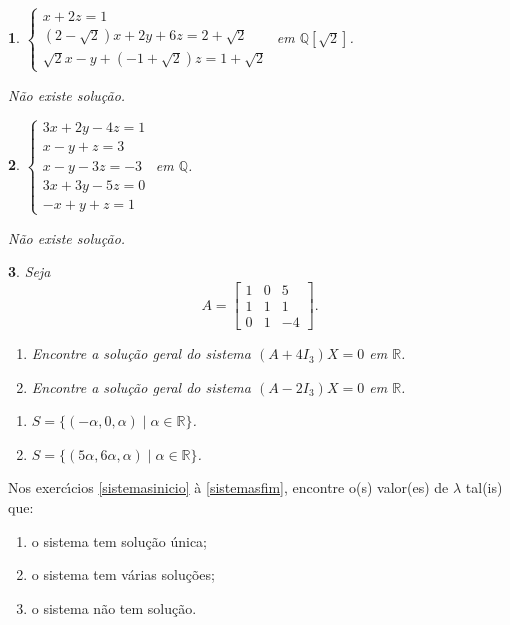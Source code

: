 \documentclass[12pt]{exam}
\newtheorem{exercicio}{}
\newcommand{\rac}{\mathbb{Q}}
\newcommand{\real}{\mathbb{R}}
\begin{document}
\begin{exercicio}
  $\begin{cases}
    x + 2z = 1\\
    (2 - \sqrt{2})x + 2y + 6z = 2 + \sqrt{2}\\
    \sqrt{2}x - y + (-1 + \sqrt{2})z = 1 + \sqrt{2}
  \end{cases}$ em $\rac[\sqrt{2}]$.
  \begin{solucao}
    N\~ao existe solu\c{c}\~ao.
  \end{solucao}
\end{exercicio}


\begin{exercicio}\label{sistemalinearfim}
  $\begin{cases}
    3x + 2y - 4z = 1\\
    x - y + z = 3\\
    x - y - 3z = -3\\
    3x + 3y - 5z =0\\
    -x + y + z = 1
  \end{cases}$ em $\rac$.
\begin{solucao}
  N\~ao existe solu\c{c}\~ao.
\end{solucao}
\end{exercicio}

\begin{exercicio}
  Seja
  \[
    A = \begin{bmatrix}
      1 & 0 & 5\\
      1 & 1 & 1\\
      0 & 1 & -4
    \end{bmatrix}.
  \]
\begin{enumerate}[label={\alph*})]
  \item Encontre a solu\c{c}\~ao geral do sistema $(A + 4I_3)X = 0$ em $\real$.
  \item Encontre a solu\c{c}\~ao geral do sistema $(A - 2I_3)X = 0$ em $\real$.
\end{enumerate}
\begin{solucao}
  \begin{enumerate}[label={\alph*})]
    \item $S = \{(-\alpha, 0, \alpha) \mid \alpha \in \real\}$.
    \item $S = \{(5\alpha, 6\alpha, \alpha) \mid \alpha \in \real\}$.
  \end{enumerate}
\end{solucao}
\end{exercicio}

Nos exerc{\'\i}cios \ref{sistemasinicio} \`a \ref{sistemasfim}, encontre o(s) valor(es) de $\lambda$ tal(is) que:
\begin{enumerate}[label={\alph*})]
  \item o sistema tem solu\c{c}\~ao \'unica;
  \item o sistema tem v\'arias solu\c{c}\~oes;
  \item o sistema n\~ao tem solu\c{c}\~ao.
\end{enumerate}
\end{document}
